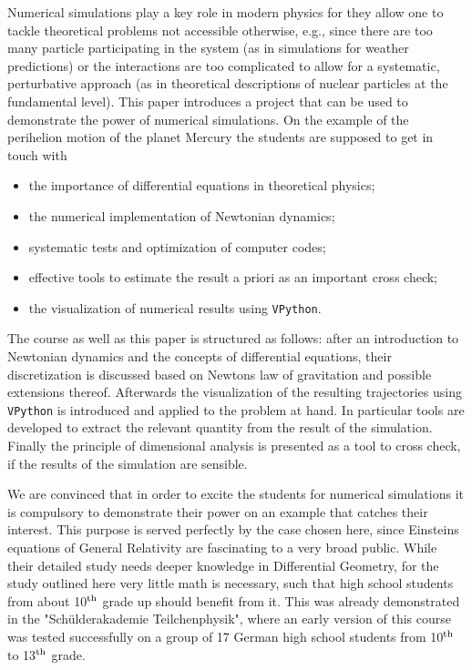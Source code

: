 \documentclass[12pt,ngerman,american]{iopart}
\begin{document}
Numerical simulations play a key role in modern physics for they allow one to tackle theoretical problems not accessible otherwise, e.g., since there are too many particle participating in the system (as in simulations for weather predictions) or the interactions are too complicated to allow for a systematic, perturbative approach (as in theoretical descriptions of nuclear particles at the fundamental level).
This paper introduces a project that can be used to demonstrate the power of numerical simulations.
On the example of the perihelion motion of the planet Mercury the students are supposed to get in touch with
\begin{itemize}
\item the importance of differential equations in theoretical physics;
\item the numerical implementation of Newtonian dynamics;
\item systematic tests and optimization of computer codes;
\item effective tools to estimate the result a priori as an important cross check;
\item the visualization of numerical results using \texttt{VPython}.
\end{itemize}
The course as well as this paper is structured as follows: after an introduction to Newtonian dynamics and the concepts of differential equations, their discretization is discussed based on Newtons law of gravitation and possible extensions thereof.
Afterwards the visualization of the resulting trajectories using \texttt{VPython} is introduced and applied to the problem at hand. In particular tools are developed to extract the relevant quantity from the result of the simulation.
Finally the principle of dimensional analysis is presented as a tool to cross check, if the results of the simulation are sensible.

We are convinced that in order to excite the students for numerical simulations it is compulsory to demonstrate their power on an example that catches their interest.
This purpose is served perfectly by the case chosen here, since Einsteins equations of General Relativity are fascinating to a very broad public.
While their detailed study needs deeper knowledge in Differential Geometry, for the study outlined here very little math is necessary, such that high school students from about 10$^{\rm th}$ grade up should benefit from it.
This was already demonstrated in the "Schülderakademie Teilchenphysik", where an early version of this course was tested successfully on a group of 17 German high school students from 10$^{\rm th}$ to 13$^{\rm th}$ grade.
\end{document}
